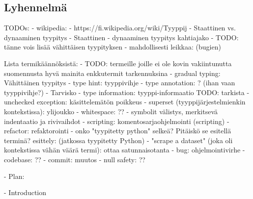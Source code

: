 \begin{otherlanguage}{finnish}
\section*{Lyhennelmä}

TODOs:
    - wikipedia:
        - https://fi.wikipedia.org/wiki/Tyyppij%
            - Staattinen vs. dynaaminen tyypitys
            - Staattinen - dynaaminen tyypitys kahtiajako
            - TODO: tänne vois lisää vähittäisen tyypityksen
    - mahdollisesti leikkaa: (bugien)

Lista termikäännöksistä:
    - TODO: termeille joille ei ole kovin vakiintunutta suomennusta hyvä mainita enkkutermit tarkennuksina
    - gradual typing: Vähittäinen tyypitys
    - type hint: tyyppivihje
    - type annotation: ? (ihan vaan tyyppivihje?)
        - Tarvisko
    - type information: tyyppi-informaatio
        TODO: tarkista
    - unchecked exception: käsittelemätön poikkeus
    - superset (tyyppijärjestelmienkin kontekstissa): ylijoukko
    - whitespace: ??
        - symbolit välistys, merkitsevä indentaatio ja rivivaihdot
    - scripting: komentosarjaohjelmointi (scripting)
    - refactor: refaktorointi
    - onko "tyypitetty python" selkeä? Pitäiskö se esitellä terminä?
        esittely: (jatkossa tyypitetty Python)
    - "scrape a dataset" (joka oli kontekstissa vähän väärä termi): ottaa satunnaisotanta
    - bug: ohjelmointivirhe
    - codebase: ??
    - commit: muutos
    - null safety: ??

- Plan:

- Introduction


\end{otherlanguage}
